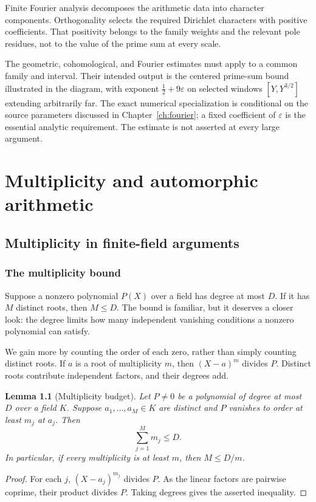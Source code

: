 \documentclass[11pt,openany,oneside]{scrbook}
\newtheorem{lemma}[theorem]{Lemma}
\theoremstyle{definition}
\theoremstyle{remark}
\begin{document}
Finite Fourier analysis decomposes the arithmetic data into character components. Orthogonality selects the required Dirichlet characters with positive coefficients. That positivity belongs to the family weights and the relevant pole residues, not to the value of the prime sum at every scale.

The geometric, cohomological, and Fourier estimates must apply to a common family and interval. Their intended output is the centered prime-sum bound illustrated in the diagram, with exponent $\tfrac12+9\varepsilon$ on selected windows $[Y,Y^{3/2}]$ extending arbitrarily far. The exact numerical specialization is conditional on the source parameters discussed in Chapter~\ref{ch:fourier}; a fixed coefficient of $\varepsilon$ is the essential analytic requirement. The estimate is not asserted at every large argument.
\endgroup

\part{Multiplicity and automorphic arithmetic}

\chapter{Multiplicity in finite-field arguments}\label{ch:multiplicity}
\section{The multiplicity bound}
Suppose a nonzero polynomial $P(X)$ over a field has degree at most $D$. If it has $M$ distinct roots, then $M\le D$. The bound is familiar, but it deserves a closer look: the degree limits how many independent vanishing conditions a nonzero polynomial can satisfy.

We gain more by counting the order of each zero, rather than simply counting distinct roots. If $a$ is a root of multiplicity $m$, then $(X-a)^m$ divides $P$. Distinct roots contribute independent factors, and their degrees add.

\begin{lemma}[Multiplicity budget]\label{lem:mult}
Let $P\ne0$ be a polynomial of degree at most $D$ over a field $K$. Suppose $a_1,\ldots,a_M\in K$ are distinct and $P$ vanishes to order at least $m_j$ at $a_j$. Then
\[
\sum_{j=1}^M m_j\le D.
\]
In particular, if every multiplicity is at least $m$, then $M\le D/m$.
\end{lemma}
\begin{proof}
For each $j$, $(X-a_j)^{m_j}$ divides $P$. As the linear factors are pairwise coprime, their product divides $P$. Taking degrees gives the asserted inequality.
\end{proof}
\end{document}
